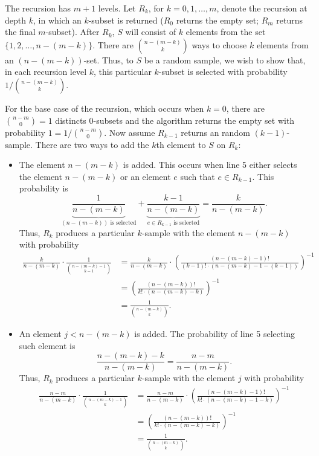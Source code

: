 \begin{enumerate}
\begin{framed}
The recursion has $m + 1$ levels. Let $R_k$, for $k = 0, 1, \dots, m$, denote
the recursion at depth $k$, in which an $k$-subset is returned ($R_0$ returns
the empty set; $R_m$ returns the final $m$-subset). After $R_k$, $S$ will
consist of $k$ elements from the set $\{1, 2, \dots, n - (m - k)\}$. There are
$\binom{n - (m - k)}{k}$ ways to choose $k$ elements from an
$(n - (m - k))$-set. Thus, to $S$ be a random sample, we wish to show that, in
each recursion level $k$, this particular $k$-subset is selected with
probability $1/\binom{n - (m - k)}{k}$.

For the base case of the recursion, which occurs when $k = 0$, there are
$\binom{n - m}{0} = 1$ distincts $0$-subsets and the algorithm returns the empty
set with probability $1 = 1/\binom{n - m}{0}$. Now assume $R_{k - 1}$ returns an
random $(k - 1)$-sample. There are two ways to add the $k$th element to $S$ on
$R_k$:
\begin{itemize}
\item The element $n - (m - k)$ is added. This occurs when line 5 either
selects the element $n - (m - k)$ or an element $e$ such that $e \in R_{k - 1}$.
This probability is
\[
  \underbrace{\frac{1}{n - (m - k)}}_\text{$(n - (m - k))$ is selected} +
  \underbrace{\frac{k - 1}{n - (m - k)}}_\text{$e \in R_{k - 1}$ is selected} = \frac{k}{n - (m - k)}.
\]
Thus, $R_k$ produces a particular $k$-sample with the element $n - (m - k)$ with
probability
\begin{equation*}
\begin{aligned}
  \frac{k}{n - (m - k)} \cdot \frac{1}{\binom{n - (m - k) - 1}{k - 1}}
  &= \frac{k}{n - (m - k)} \cdot \left(\frac{(n - (m - k) - 1)!}{(k - 1)! \cdot (n - (m - k) - 1 - (k - 1))}\right)^{-1}\\
  &= \left(\frac{(n - (m - k))!}{k! \cdot (n - (m - k) - k )}\right)^{-1}\\
  &= \frac{1}{\binom{n - (m - k)}{k}}.
\end{aligned}
\end{equation*}

\item An element $j < n - (m - k)$ is added. The probability of line 5 selecting
such element is
\[
  \frac{n - (m - k) - k}{n - (m - k)} = \frac{n - m}{n - (m - k)}.
\]
Thus, $R_k$ produces a particular $k$-sample with the element $j$ with
probability
\begin{equation*}
\begin{aligned}
  \frac{n - m}{n - (m - k)} \cdot \frac{1}{\binom{n - (m - k) - 1}{k}}
  &= \frac{n - m}{n - (m - k)} \cdot \left(\frac{(n - (m - k) - 1)!}{k! \cdot (n - (m - k) - 1 - k)}\right)^{-1}\\
  &= \left(\frac{(n - (m - k))!}{k! \cdot (n - (m - k) - k)}\right)^{-1}\\
  &= \frac{1}{\binom{n - (m - k)}{k}}.
\end{aligned}
\end{equation*}
\end{itemize}


\end{framed}
\end{enumerate}

